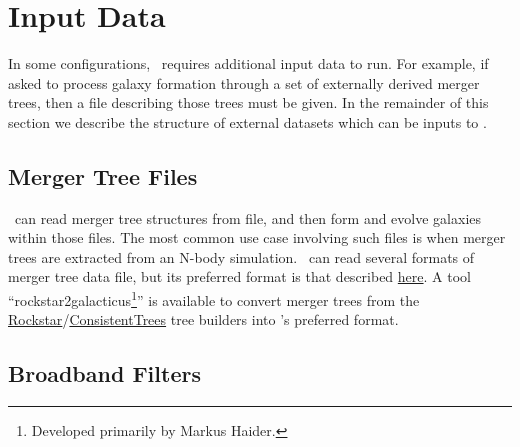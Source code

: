\chapter{Input Data}

In some configurations, \glc\ requires additional input data to run. For example, if asked to process galaxy formation through a set of externally derived merger trees, then a file describing those trees must be given. In the remainder of this section we describe the structure of external datasets which can be inputs to \glc.

\section{Merger Tree Files}

\glc\ can read merger tree structures from file, and then form and evolve galaxies within those files. The most common use case involving such files is when merger trees are extracted from an N-body simulation. \glc\ can read several formats of merger tree data file, but its preferred format is that described \href{https://github.com/galacticusorg/galacticus/wiki/Merger-Tree-File-Format}{here}. A tool ``{\normalfont \ttfamily rockstar2galacticus}\footnote{Developed primarily by Markus Haider.}'' is available to convert merger trees from the \href{https://bitbucket.org/gfcstanford/rockstar}{\normalfont \ttfamily Rockstar}/\href{https://bitbucket.org/pbehroozi/consistent-trees}{\normalfont \ttfamily ConsistentTrees} tree builders into \glc's preferred format.

\section{Broadband Filters}


